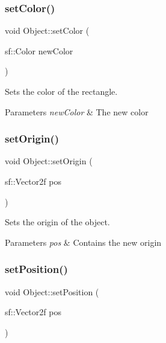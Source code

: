 \subsubsection{\texorpdfstring{set\+Color()}{setColor()}}
{\footnotesize\ttfamily void Object\+::set\+Color (\begin{DoxyParamCaption}\item[{sf\+::\+Color}]{new\+Color }\end{DoxyParamCaption})}



Sets the color of the rectangle. 


\begin{DoxyParams}{Parameters}
{\em new\+Color} & The new color \\
\hline
\end{DoxyParams}
\mbox{\label{class_object_adb4b797ded7041cade7af9bae71c341b}} 
\subsubsection{\texorpdfstring{set\+Origin()}{setOrigin()}}
{\footnotesize\ttfamily void Object\+::set\+Origin (\begin{DoxyParamCaption}\item[{sf\+::\+Vector2f}]{pos }\end{DoxyParamCaption})}



Sets the origin of the object. 


\begin{DoxyParams}{Parameters}
{\em pos} & Contains the new origin \\
\hline
\end{DoxyParams}
\mbox{\label{class_object_ae3f485491191476e1c89c37a29d0e01f}} 
\subsubsection{\texorpdfstring{set\+Position()}{setPosition()}}
{\footnotesize\ttfamily void Object\+::set\+Position (\begin{DoxyParamCaption}\item[{sf\+::\+Vector2f}]{pos }\end{DoxyParamCaption})}



